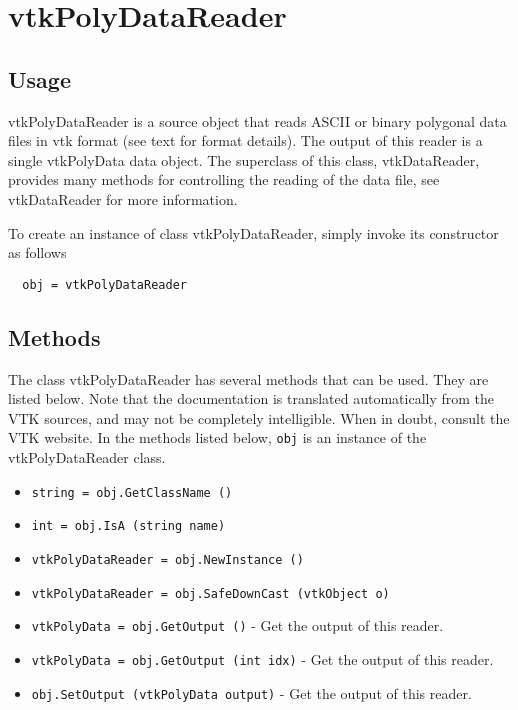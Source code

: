 \section{vtkPolyDataReader}

\subsection{Usage}

 vtkPolyDataReader is a source object that reads ASCII or binary 
 polygonal data files in vtk format (see text for format details).
 The output of this reader is a single vtkPolyData data object.
 The superclass of this class, vtkDataReader, provides many methods for
 controlling the reading of the data file, see vtkDataReader for more
 information.

To create an instance of class vtkPolyDataReader, simply
invoke its constructor as follows
\begin{verbatim}
  obj = vtkPolyDataReader
\end{verbatim}
\subsection{Methods}

The class vtkPolyDataReader has several methods that can be used.
  They are listed below.
Note that the documentation is translated automatically from the VTK sources,
and may not be completely intelligible.  When in doubt, consult the VTK website.
In the methods listed below, \verb|obj| is an instance of the vtkPolyDataReader class.
\begin{itemize}
\item  \verb|string = obj.GetClassName ()|

\item  \verb|int = obj.IsA (string name)|

\item  \verb|vtkPolyDataReader = obj.NewInstance ()|

\item  \verb|vtkPolyDataReader = obj.SafeDownCast (vtkObject o)|

\item  \verb|vtkPolyData = obj.GetOutput ()| -  Get the output of this reader.

\item  \verb|vtkPolyData = obj.GetOutput (int idx)| -  Get the output of this reader.

\item  \verb|obj.SetOutput (vtkPolyData output)| -  Get the output of this reader.

\end{itemize}
